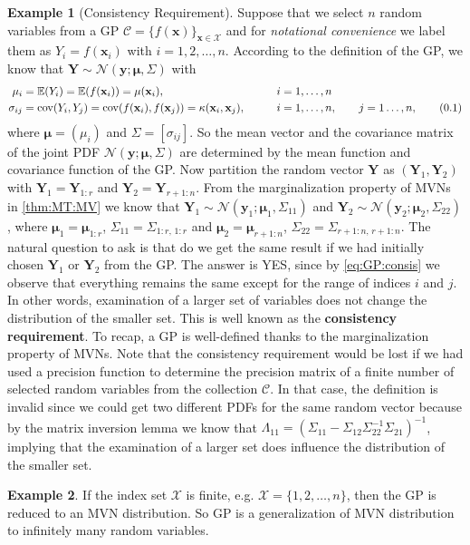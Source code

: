\documentclass[10pt]{article}
\theoremstyle{definition}
\newtheorem{exmp}{Example}[section]
\newcommand\eqnum{\addtocounter{equation}{1}\tag{\arabic{section}.\arabic{equation}}}
\DeclareMathOperator{\cov}{cov}
\begin{document}
\begin{exmp}[Consistency Requirement]
Suppose that we select $n$ random variables from a GP $\mathscr{C} = \{f(\mathbf{x})\}_{\mathbf{x}\in\mathcal{X}}$ and for \textit{notational convenience} we label them as $Y_i=f(\mathbf{x}_i)$ with $i=1,2,\dots,n$. According to the definition of the GP, we know that $\mathbf{Y}\sim\mathcal{N}(\mathbf{y};\boldsymbol{\mu}, \mathsf{\Sigma})$ with
\begin{alignat*}{2}
\mu_i &= \mathbb{E}(Y_i) =\mathbb{E}(f(\mathbf{x}_i)) = \mu(\mathbf{x}_i), && i=1,\dots, n\\
\sigma_{ij} &= \cov(Y_i, Y_j) = \cov(f(\mathbf{x}_i), f(\mathbf{x}_j)) = \kappa(\mathbf{x}_i, \mathbf{x}_j), \qquad && i=1,\dots, n, \qquad j = 1\dots,n,
\eqnum
\label{eq:GP:consis}
\end{alignat*}
where $\boldsymbol{\mu}=(\mu_i)$ and $\mathsf{\Sigma}=[\sigma_{ij}]$. So the mean vector and the covariance matrix of the joint PDF $\mathcal{N}(\mathbf{y};\boldsymbol{\mu}, \mathsf{\Sigma})$ are determined by the mean function and covariance function of the GP. Now partition the random vector $\mathbf{Y}$ as $(\mathbf{Y}_1, \mathbf{Y}_2)$ with $\mathbf{Y}_1=\mathbf{Y}_{1:r}$ and $\mathbf{Y}_2=\mathbf{Y}_{r+1:n}$. From the marginalization property of MVNs in \cref{thm:MT:MV} we know that $\mathbf{Y}_1 \sim \mathcal{N}(\mathbf{y}_1; \boldsymbol{\mu}_1, \mathsf{\Sigma}_{11})$ and $\mathbf{Y}_2 \sim \mathcal{N}(\mathbf{y}_2; \boldsymbol{\mu}_2, \mathsf{\Sigma}_{22})$, where $\boldsymbol{\mu}_1 = \boldsymbol{\mu}_{1:r}$, $\mathsf{\Sigma}_{11}=\mathsf{\Sigma}_{1:r,\,1:r}$ and $\boldsymbol{\mu}_2 = \boldsymbol{\mu}_{r+1:n}$, $\mathsf{\Sigma}_{22}=\mathsf{\Sigma}_{r+1:n,\,r+1:n}$. The natural question to ask is that do we get the same result if we had initially chosen $\mathbf{Y}_1$ or $\mathbf{Y}_2$ from the GP. The answer is YES, since by \cref{eq:GP:consis} we observe that everything remains the same except for the range of indices $i$ and $j$. In other words, examination of a larger set of variables does not change the distribution of the smaller set. This is well known as the \textbf{consistency requirement}. To recap, a GP is well-defined thanks to the marginalization property of MVNs. Note that the consistency requirement would be lost if we had used a precision function to determine the precision matrix of a finite number of selected random variables from the collection $\mathscr{C}$. In that case, the definition is invalid since we could get two different PDFs for the same random vector because by the matrix inversion lemma we know that $\mathsf{\Lambda}_{11} = (\mathsf{\Sigma}_{11} - \mathsf{\Sigma}_{12} \mathsf{\Sigma}_{22}^{-1} \mathsf{\Sigma}_{21})^{-1}$, implying that the examination of a larger set does influence the distribution of the smaller set.
\end{exmp}
\begin{exmp}
If the index set $\mathcal{X}$ is finite, e.g. $\mathcal{X}=\{1,2,\dots,n\}$, then the GP is reduced to an MVN distribution. So GP is a generalization of MVN distribution to infinitely many random variables.
\end{exmp}
\end{document}
